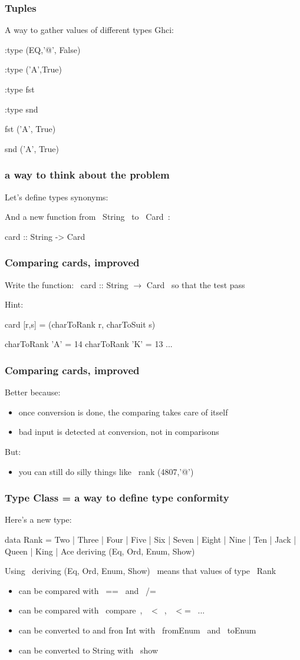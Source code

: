 \documentclass[11pt,xcolor={dvipsnames}]{beamer}
\newcommand{\tc}{\textcolor}
\newcommand{\key}[1]{\tc{orange}{#1}}
\newcommand{\rk}{\enskip{\key{$\hookleftarrow$}}}
\newcommand{\vs}{\vspace{1em}}
\newcommand{\lstH}[1]{}
\newcommand{\lstT}[1]{}
\begin{document}
\begin{frame}[fragile]
\frametitle{Tuples}
A way to gather values of different types
\vs
Ghci:
\begin{term}
:type (EQ,'@', False)\rk

:type ('A',True)\rk

:type fst\rk

:type snd\rk

fst ('A', True)\rk

snd ('A', True) \rk
\end{term}
\end{frame}
\begin{frame}[fragile]
\frametitle{a way to think about the problem}
Let's define types synonyms:
\lstH{022}
And a new function from ~String~ to ~Card~:
\begin{haskell}
card :: String -> Card
\end{haskell}
\end{frame}
\begin{frame}[fragile]
\frametitle{Comparing cards, improved}
Write the function: ~card :: String $\rightarrow$ Card~ 
so that the test pass
\lstT{023}
Hint:
\begin{haskell}
card [r,s] = (charToRank r, charToSuit s)

charToRank 'A' = 14
charToRank 'K' = 13
...
\end{haskell}
\end{frame}
\begin{frame}[fragile]
\frametitle{Comparing cards, improved}
\lstH{024}
Better because:
\begin{itemize}
\item  once conversion is done, the comparing takes care of itself
\item  bad input is detected at conversion, not in comparisons
\end{itemize}
But:
\begin{itemize}
\item  you can still do silly things like ~rank (4807,'@')~ 
\end{itemize}
\end{frame}
\begin{frame}[fragile]
\frametitle{Type Class = a way to define type conformity}
Here's a new type:
\begin{haskell}
data Rank = Two | Three | Four | Five | Six | Seven | Eight 
          | Nine | Ten | Jack | Queen | King | Ace
    deriving (Eq, Ord, Enum, Show)
\end{haskell}
Using ~deriving (Eq, Ord, Enum,  Show)~ means that values of type ~Rank~ 
\begin{itemize}
\item  can be compared with ~==~ and ~/=~ 
\item  can be compared with ~compare~, ~$<$~, ~$<$=~ ...
\item  can be converted to and fron Int with ~fromEnum~ and ~toEnum~
\item  can be converted to String with ~show~
\end{itemize}
\end{frame}
\end{document}
